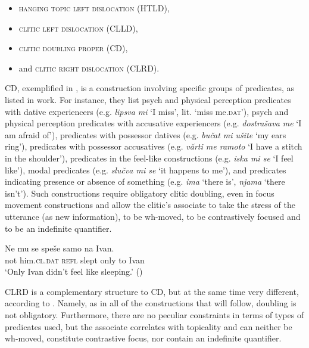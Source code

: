 \documentclass[output=paper,
colorlinks,
citecolor=brown,
newtxmath
]{langscibook}
\begin{document}
\begin{itemize}
\item \textsc{hanging topic left dislocation} (HTLD),
\item \textsc{clitic left dislocation} (CLLD),
\item \textsc{clitic doubling proper} (CD),
\item and \textsc{clitic right dislocation} (CLRD).
\end{itemize}

CD, exemplified in , is a construction involving specific groups of predicates, as listed in  work. For instance, they list psych and physical perception predicates with dative experiencers (e.g. \textit{lipsva mi} `I miss', lit. `miss me.\textsc{dat}'), psych and physical perception predicates with accusative experiencers (e.g. \textit{dostrašava me} `I am afraid of'), predicates with possessor datives (e.g. \textit{bučat mi ušite} `my ears ring'), predicates with possessor accusatives (e.g. \textit{vărti me ramoto} `I have a stitch in the shoulder'), predicates in the feel-like constructions (e.g. \textit{iska mi se} `I feel like'), modal predicates (e.g. \textit{slučva mi se} `it happens to me'), and predicates indicating presence or absence of something (e.g. \textit{ima} `there is', \textit{njama} `there isn’t'). Such constructions require obligatory clitic doubling, even in focus movement constructions and allow the clitic’s associate to take the stress of the utterance (as new information), to be wh-moved, to be contrastively focused and to be an indefinite quantifier.


\ea\label{ex:zivojinovic:6}
\gll Ne  mu          se   speše samo na Ivan.\\
     not him.\textsc{cl.dat} \textsc{refl} slept only to Ivan \\
\glt `Only Ivan didn't feel like sleeping.'
\hfill ()
\z

\noindent CLRD is a complementary structure to CD, but at the same time very different, according to \citet{Cinque.Krapova2008}. Namely, as in all of the constructions that will follow, doubling is not obligatory. Furthermore, there are no peculiar constraints in terms of types of predicates used, but the associate correlates with topicality and can neither be wh-moved, constitute contrastive focus, nor contain an indefinite quantifier.

\end{document}

